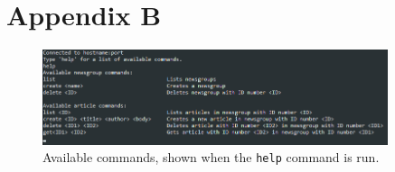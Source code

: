 \documentclass[a4paper]{article}
\begin{document}
\newpage
\section*{Appendix B}


\begin{figure}[h]
    \centering
    \includegraphics[width=0.9\textwidth]{help_text_appendix.png}
    \caption{Available commands, shown when the \texttt{help} command is run.}
    \label{fig:help}
\end{figure}
\end{document}

